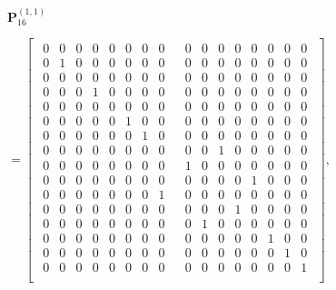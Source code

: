 \documentclass{jtacs}
\numberwithin{equation}{section}
\begin{document}
\begin{center}
$\mathbf{P}_{16}^{(1,1)}$
\begin{adjustbox}{width=0.55\textwidth, margin= 0 0}
$
=\left[
\begin{array}{cc}
\begin{matrix}
0 & 0 & 0 & 0 & 0 & 0 & 0 & 0 \\
0 & 1 & 0 & 0 & 0 & 0 & 0 & 0 \\
0 & 0 & 0 & 0 & 0 & 0 & 0 & 0 \\
0 & 0 & 0 & 1 & 0 & 0 & 0 & 0 \\
0 & 0 & 0 & 0 & 0 & 0 & 0 & 0 \\
0 & 0 & 0 & 0 & 0 & 1 & 0 & 0 \\
0 & 0 & 0 & 0 & 0 & 0 & 1 & 0 \\
0 & 0 & 0 & 0 & 0 & 0 & 0 & 0 \\
0 & 0 & 0 & 0 & 0 & 0 & 0 & 0 \\
0 & 0 & 0 & 0 & 0 & 0 & 0 & 0 \\
0 & 0 & 0 & 0 & 0 & 0 & 0 & 1 \\
0 & 0 & 0 & 0 & 0 & 0 & 0 & 0 \\
0 & 0 & 0 & 0 & 0 & 0 & 0 & 0 \\
0 & 0 & 0 & 0 & 0 & 0 & 0 & 0 \\
0 & 0 & 0 & 0 & 0 & 0 & 0 & 0 \\
0 & 0 & 0 & 0 & 0 & 0 & 0 & 0 \\
\end{matrix}
&
\begin{matrix}
0 & 0 & 0 & 0 & 0 & 0 & 0 & 0 \\
0 & 0 & 0 & 0 & 0 & 0 & 0 & 0 \\
0 & 0 & 0 & 0 & 0 & 0 & 0 & 0 \\
0 & 0 & 0 & 0 & 0 & 0 & 0 & 0 \\
0 & 0 & 0 & 0 & 0 & 0 & 0 & 0 \\
0 & 0 & 0 & 0 & 0 & 0 & 0 & 0 \\
0 & 0 & 0 & 0 & 0 & 0 & 0 & 0 \\
0 & 0 & 1 & 0 & 0 & 0 & 0 & 0 \\
1 & 0 & 0 & 0 & 0 & 0 & 0 & 0 \\
0 & 0 & 0 & 0 & 1 & 0 & 0 & 0 \\
0 & 0 & 0 & 0 & 0 & 0 & 0 & 0 \\
0 & 0 & 0 & 1 & 0 & 0 & 0 & 0 \\
0 & 1 & 0 & 0 & 0 & 0 & 0 & 0 \\
0 & 0 & 0 & 0 & 0 & 1 & 0 & 0 \\
0 & 0 & 0 & 0 & 0 & 0 & 1 & 0 \\
0 & 0 & 0 & 0 & 0 & 0 & 0 & 1 \\
\end{matrix}
\end{array}
\right],
$
\end{adjustbox}\end{center}
\end{document}
